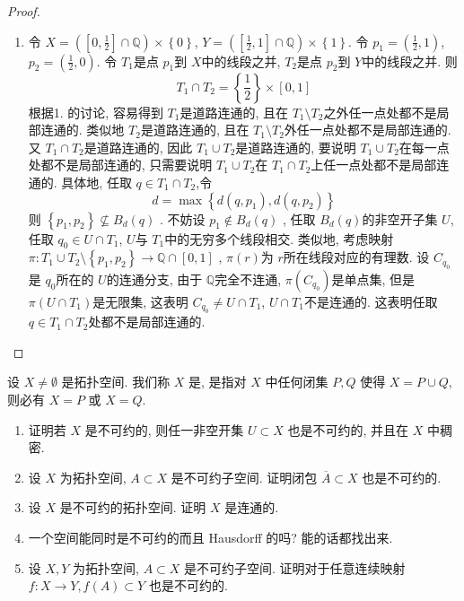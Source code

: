 \documentclass[../main.tex]{subfiles}
\begin{document}
\begin{proof}
\begin{enumerate}
        \item 令 \(  X= \left( \left[ 0,\frac{1 }{2 }  \right]\cap \mathbb{Q}   \right)\times \left\{ 0 \right\}   \), \( Y= \left( \left[ \frac{1 }{2 } ,1 \right]\cap \mathbb{Q} \right)  \times \left\{ 1 \right\}    \). 令 \(  p_1= \left( \frac{1 }{2 },1  \right)   \), \(  p_2= \left( \frac{1 }{2 },0  \right)   \).   令 \(  T_1  \)是点 \(  p_1  \)到 \(  X  \)中的线段之并, \(  T_2  \)是点 \(  p_2  \)到 \(  Y  \)中的线段之并. 则 \[
        T_1\cap T_2= \left\{ \frac{1 }{2 }  \right\}\times \left[ 0,1 \right] 
        \]       根据1. 的讨论, 容易得到 \(  T_1  \)是道路连通的, 且在  \(  T_1\setminus T_2  \)之外任一点处都不是局部连通的.  类似地 \(  T_2  \)是道路连通的, 且在 \(  T_1\setminus T_2  \)外任一点处都不是局部连通的. 又 \(  T_1\cap T_2  \)是道路连通的, 因此 \(  T_1\cup T_2  \)是道路连通的, 要说明 \(  T_1\cup T_2  \)在每一点处都不是局部连通的, 只需要说明 \(  T_1\cup T_2  \)在 \(  T_1\cap T_2  \)上任一点处都不是局部连通的. 具体地, 任取 \(  q \in T_1\cap T_2  \),令 \[
        d=  \max \left\{ d\left( q,p_1 \right),d\left( q,p_2 \right)   \right\}
        \]则 \( \left\{ p_1,p_2 \right\}\not \subseteq  B_{d}\left( q \right) \) .  不妨设 \(  p_1\not \in B_{d}\left( q \right)   \)  , 任取 \(  B_{d}\left( q \right)   \)的非空开子集 \(  U  \),            任取 \(  q_0\in U\cap T_1  \), \(  U  \)与 \(  T_1  \)中的无穷多个线段相交. 类似地, 考虑映射 \(   \pi:T_1\cup T_2\setminus \left\{ p_1,p_2 \right\}\to \mathbb{Q} \cap \left[ 0,1 \right]   \) ,  \(   \pi\left( r \right)   \)为 \(  r  \)所在线段对应的有理数.   设 \(  C_{q_0}  \)是 \(  q_0  \)所在的 \(  U  \)的连通分支, 由于 \(  \mathbb{Q}   \)完全不连通, \(   \pi\left( C_{q_0} \right)   \)是单点集, 但是 \(   \pi\left( U\cap T_1 \right)   \)是无限集, 这表明 \(  C_{q_0}\neq U  \cap T_1\), \(  U \cap T_1 \)不是连通的. 这表明任取 \(  q \in T_1\cap T_2  \)处都不是局部连通的.            
    \end{enumerate}
    
\end{proof}
\begin{exercise}{}{}
    设 $X \neq \emptyset$ 是拓扑空间. 我们称 $X$ 是, 是指对 $X$ 中任何闭集 $P, Q$ 使得 $X = P \cup Q$, 则必有 $X = P$ 或 $X = Q$.
    
 
\begin{enumerate}
    \item 证明若 $X$ 是不可约的, 则任一非空开集 $U \subset X$ 也是不可约的, 并且在 $X$ 中稠密.
    \item 设 $X$ 为拓扑空间, $A \subset X$ 是不可约子空间. 证明闭包 $\overline{A} \subset X$ 也是不可约的.
    \item 设 $X$ 是不可约的拓扑空间. 证明 $X$ 是连通的.
    \item 一个空间能同时是不可约的而且 Hausdorff 的吗? 能的话都找出来.
    \item 设 $X, Y$ 为拓扑空间, $A \subset X$ 是不可约子空间. 证明对于任意连续映射 $f: X \to Y, f(A) \subset Y$ 也是不可约的.
\end{enumerate}
\end{exercise}
\end{document}
